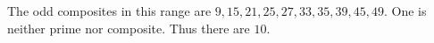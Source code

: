 The odd composites in this range are $9,15,21,25,27,33,35,39,45,49$. One is neither prime nor composite. Thus there are $\boxed{10}$.
